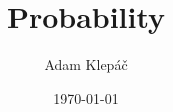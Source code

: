 \documentclass[aspectratio=169,11pt,usenames,dvipsnames,handout]{beamer}
\title{Probability}
\date{\today}
\author{Adam Klepáč}
\institute[GEVO]{Gymnázium Evolution Jižní Město}
\newcommand{\clr}{\textcolor{BrickRed}}
\newcommand{\clg}{\textcolor{ForestGreen}}
\begin{document}
\titleframe

%
%
%
\end{document}

